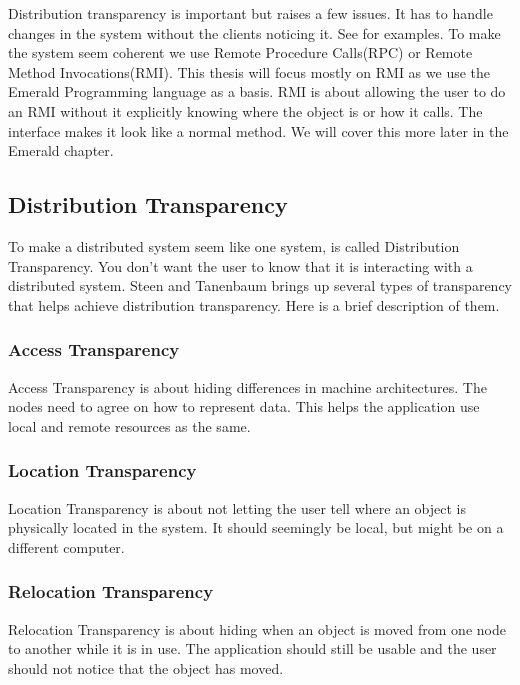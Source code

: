 Distribution transparency is important but raises a few issues. It has to handle changes in the system without the clients noticing it. See 
for examples. To make the system seem coherent we use Remote Procedure Calls(RPC) or Remote Method Invocations(RMI). This thesis will focus mostly on RMI as we use the Emerald Programming language as a basis. RMI is about allowing the user to do an RMI without it explicitly knowing where the object is or how it calls. The interface makes it look like a normal method. We will cover this more later in the Emerald chapter.



\subsection{Distribution Transparency}
To make a distributed system seem like one system, is called Distribution Transparency. You don't want the user to know that it is interacting with a distributed system. Steen and Tanenbaum brings up several types of transparency that helps achieve distribution transparency. Here is a brief description of them.

\subsubsection{Access Transparency}
Access Transparency is about hiding differences in machine architectures. The nodes need to agree on how to represent data. This helps the application use local and remote resources as the same. 

\subsubsection{Location Transparency}
Location Transparency is about not letting the user tell where an object is physically located in the system. It should seemingly be local, but might be on a different computer.

\subsubsection{Relocation Transparency}
Relocation Transparency is about hiding when an object is moved from one node to another while it is in use. The application should still be usable and the user should not notice that the object has moved.


